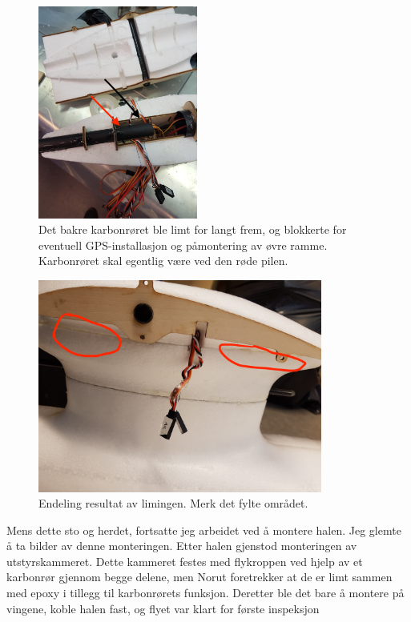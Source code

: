 \documentclass[12pt, a4paper]{report}
\begin{document}
\begin{figure}[ht]
	\centering
	\includegraphics[height = 7cm, width = .6\textwidth]{bilder/feilmontering_av_karbon_red.jpg}
	\caption{Det bakre karbonrøret ble limt for langt frem, og blokkerte for eventuell GPS-installasjon og påmontering av øvre ramme. Karbonrøret skal egentlig være ved den røde pilen.}
\end{figure}

\begin{figure}[ht]
 \centering
 \includegraphics[height=7cm, width = .6\textwidth]{bilder/fylling2_red.jpg}
 \caption{Endeling resultat av limingen. Merk det fylte området.}
\end{figure}
\newpage

Mens dette sto og herdet, fortsatte jeg arbeidet ved å montere halen. Jeg glemte å ta bilder av denne monteringen. Etter halen gjenstod monteringen av utstyrskammeret. Dette kammeret festes med flykroppen ved hjelp av et karbonrør gjennom begge delene, men Norut foretrekker at de er limt sammen med epoxy i tillegg til karbonrørets funksjon. Deretter ble det bare å montere på vingene, koble halen fast, og flyet var klart for første inspeksjon
\end{document}
